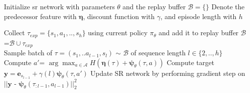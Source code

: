 \documentclass{article}
\theoremstyle{plain}
\theoremstyle{definition}
\theoremstyle{remark}
\newcommand{\alg}{$\eta$$\psi$-Learning}
\begin{document}
\begin{algorithm}[tb]
   \caption{\alg{}: Finite Action Space Framework}
   \label{algo:epl_qlearning}
\begin{algorithmic}[1]
    \STATE Initialize \gls{sr} network with parameters $\theta$ and the replay buffer $\mathcal{B}=\{\}$
    \STATE Denote the predecessor feature with $\pmb{\eta}$, discount function with $\gamma$, and episode length with $h$
    
    \STATE Collect $\tau_{exp}=\{s_1,a_1,..,s_h\}$ using current policy $\pi_{\theta}$ and add it to replay buffer $\mathcal{B}$=$\mathcal{B} \cup \tau_{exp}$
    \\
        \STATE Sample batch of $\tau=(s_1,..a_{l-1},s_l)$ $\sim$ $\mathcal{B}$ of sequence length $l \in \{2,..,h\}$
        \STATE Compute $a'$= $\arg \max_{a \in \mathcal{A}} H(\pmb{\eta} (\tau) + \pmb{\psi}_{\theta} (\tau, a))$
        \STATE Compute target $\pmb{y} = \pmb{e}_{s_{l-1}} + \gamma(l) \pmb{\psi}_{\theta}(\tau, a')$
        \STATE Update SR network by performing gradient step on $||\pmb{y}$ - $\pmb{\psi}_{\theta}(\tau_{:l-1}, a_{l-1})||_2^2$
    \ENDFOR
   \ENDWHILE
\end{algorithmic}
\end{algorithm}
\end{document}
